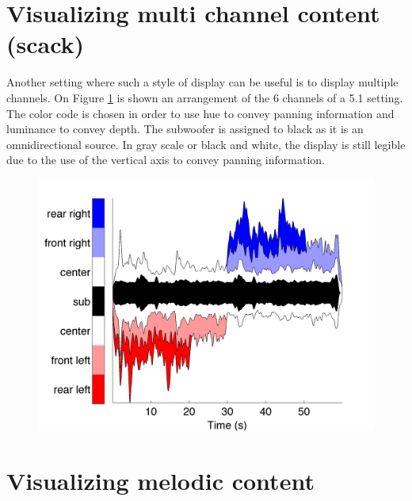\documentclass{article}
\begin{document}
\section{Visualizing multi channel content (scack)}\label{sec:scack}

Another setting where such a style of display can be useful is to display multiple channels. On Figure \ref{fig:scack} is shown an arrangement of the 6 channels of a 5.1 setting. The color code is chosen in order to use hue to convey panning information and luminance to convey depth. The subwoofer is assigned to black as it is an omnidirectional source. In gray scale or black and white, the display is still legible due to the use of the vertical axis to convey panning information.

\begin{figure}[ht]
\begin{center}
\includegraphics[width=.5\textwidth]{51SceneSynth_scack}
\caption{}
\label{fig:scack}
\end{center}
\end{figure}

%


\section{Visualizing melodic content}\label{sec:schack}
\end{document}
